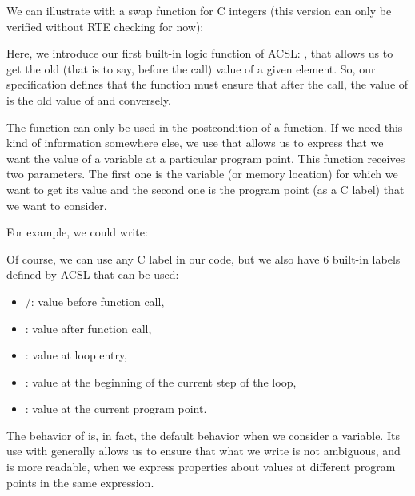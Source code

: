 We can illustrate with a swap function for C integers (this version can
only be verified without RTE checking for now):








Here, we introduce our first built-in logic function of ACSL:
, that allows us to get the old (that
is to say, before the call) value of a given element. So, our specification
defines that the function must ensure that after the call, the value of
 is the old  value of  and conversely.

The  function can only be used in the
postcondition of a function. If we need this kind of information
somewhere else, we use  that allows us
to express that we want the value of a variable at a particular program
point. This function receives two parameters. The first one is the variable
(or memory location) for which we want to get its value and the second one
is the program point (as a C label) that we want to consider.

For example, we could write:






Of course, we can use any C label in our code, but we also have 6
built-in labels defined by ACSL that can be used:



\begin{itemize}
\item {}/: value before function call,
\item {}: value after function call,
\item {}: value at loop entry,
\item {}: value at the beginning of the current step of
  the loop,
\item {}: value at the current program point.
\end{itemize}


\begin{Information}
  The behavior of  is, in fact, the default behavior when we
  consider a variable. Its use with 
  generally allows us to ensure that what we write is not ambiguous, and is more
  readable, when we express properties about values at different program
  points in the same expression.
\end{Information}


